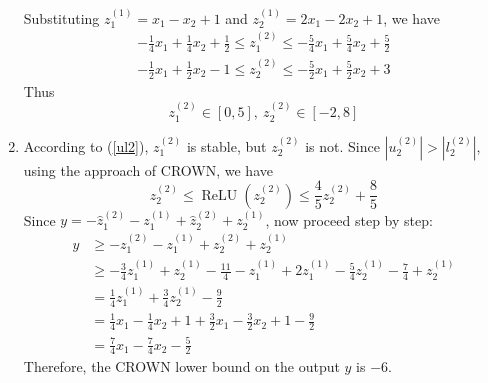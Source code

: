 \documentclass[12pt]{article}
\newcommand{\var}[3]{#1_{#2}^{(#3)}}
\newcommand{\relu}[1]{\operatorname{ReLU}\left(#1\right)}
\begin{document}
\begin{enumerate}[1.]
	Substituting $\var{z}{1}{1} = x_{1} - x_{2} + 1$ and $\var{z}{2}{1} = 2 x_{1} - 2 x_{2} + 1$, we have
	\begin{equation}
	\begin{gathered}
		-\frac{1}{4} x_{1} + \frac{1}{4} x_{2} + \frac{1}{2} \leqslant \var{z}{1}{2} \leqslant -\frac{5}{4} x_{1} +  \frac{5}{4} x_{2} + \frac{5}{2}\\
		-\frac{1}{2} x_{1} + \frac{1}{2} x_{2} - 1 \leqslant \var{z}{2}{2} \leqslant -\frac{5}{2} x_{1} + \frac{5}{2} x_{2} + 3
	\end{gathered}
	\end{equation}
	Thus
	\begin{equation}
		\label{ul2}
		\var{z}{1}{2} \in \left[0, 5\right], \ \var{z}{2}{2} \in \left[-2, 8\right]
	\end{equation}
	
\item According to (\ref{ul2}), $\var{z}{1}{2}$ is stable, but $\var{z}{2}{2}$ is not. Since $|\var{u}{2}{2}| > |\var{l}{2}{2}| $, using the approach of CROWN, we have
	\begin{equation}
		\var{z}{2}{2} \leqslant \relu{\var{z}{2}{2}} \leqslant \frac{4}{5} \var{z}{2}{2} + \frac{8}{5}
	\end{equation}
	Since $y = -\var{\hat{z}}{1}{2} - \var{z}{1}{1} + \var{\hat{z}}{2}{2} + \var{z}{2}{1}$, now proceed step by step:
	\begin{equation}
	\begin{aligned}
		y & \geqslant -\var{z}{1}{2} - \var{z}{1}{1} + \var{z}{2}{2} + \var{z}{2}{1}\\
		& \geqslant -\frac{3}{4} \var{z}{1}{1} + \var{z}{2}{1} - \frac{11}{4} - \var{z}{1}{1} + 2 \var{z}{1}{1} - \frac{5}{4} \var{z}{2}{1} - \frac{7}{4} + \var{z}{2}{1}\\
		& = \frac{1}{4} \var{z}{1}{1} + \frac{3}{4} \var{z}{2}{1} - \frac{9}{2}\\
		& = \frac{1}{4} x_{1} - \frac{1}{4} x_{2} + 1 + \frac{3}{2} x_{1} - \frac{3}{2} x_{2} + 1 - \frac{9}{2}\\
		& = \frac{7}{4} x_{1} - \frac{7}{4} x_{2} - \frac{5}{2}
	\end{aligned}
	\end{equation}
	Therefore, the CROWN lower bound on the output $y$ is $-6$.
	

\end{enumerate}
\end{document}
